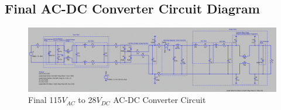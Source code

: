 \documentclass[conference]{IEEEtran}
\begin{document}
\nocite{*}



\newpage

\begin{appendices}

\onecolumn

\section{Final AC-DC Converter Circuit Diagram}

\begin{figure}[!htb]
    \centering
    \includegraphics[width=\textwidth]{ac_dc_ltspice_final_implementation.png}
    \caption{Final 115$V_{AC}$ to 28$V_{DC}$ AC-DC Converter Circuit}
    \label{fig:ac_dc_ltspice_final_implementation_waveform}
\end{figure}

\end{appendices}
\end{document}
